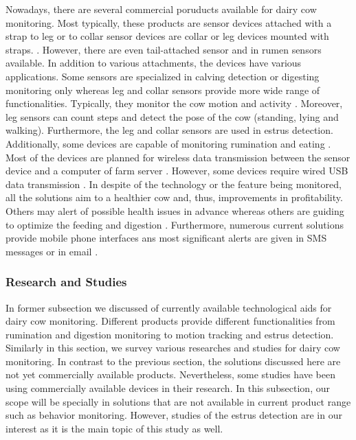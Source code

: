 \documentclass[english,12pt,a4paper,pdftex,elec,utf8]{aaltothesis}
\begin{document}
Nowadays, there are several commercial poruducts available for dairy cow monitoring. Most typically, these products are sensor devices attached with a strap to leg \cite{iceroboticproductbrochure,geacowscout} or to collar \cite{heatime,geacowscout,moocall} sensor devices are collar or leg devices mounted with straps. \cite{heatime} \cite{iceroboticproductbrochure}. However, there are even tail-attached sensor \cite{moocall} and in rumen \cite{wellcowbolus} sensors available. In addition to various attachments, the devices have various applications. Some sensors are specialized in calving detection \cite{moocall} or digesting monitoring \cite{wellcowbolus} only whereas leg and collar sensors provide more wide range of functionalities. Typically, they monitor the cow motion and activity \cite{iceroboticproductbrochure, heatime, geacowscout, moocall}. Moreover, leg sensors can count steps and detect the pose of the cow (standing, lying and walking). Furthermore, the leg and collar sensors are used in estrus detection. Additionally, some devices are capable of monitoring rumination \cite{heatime} and eating \cite{geacowscout}. Most of the devices are planned for wireless data transmission between the sensor device and a computer of farm server \cite{heatime} \cite{geacowscout} \cite{iceroboticproductbrochure} \cite{wellcowbolus}. However, some devices require wired USB data transmission \cite{iceroboticproductbrochure}. In despite of the technology or the feature being monitored, all the solutions aim to a healthier cow and, thus, improvements in profitability. Others may alert of possible health issues in advance \cite{heatime, geacowscout, iceroboticproductbrochure} whereas others are guiding to optimize the feeding and digestion \cite{wellcowbolus}. Furthermore, numerous current solutions provide mobile phone interfaces ans most significant alerts are given in SMS messages or in email \cite{heatime}.

\subsubsection{Research and Studies} \label{researchandstudiessection}

In former subsection we discussed of currently available technological aids for dairy cow monitoring. Different products provide different functionalities from rumination and digestion monitoring to motion tracking and estrus detection. Similarly in this section, we survey various researches and studies for dairy cow monitoring. In contrast to the previous section, the solutions discussed here are not yet commercially available products. Nevertheless, some studies have been using commercially available devices in their research. In this subsection, our scope will be specially in solutions that are not available in current product range such as behavior monitoring. However, studies of the estrus detection are in our interest as it is the main topic of this study as well. 
\end{document}
